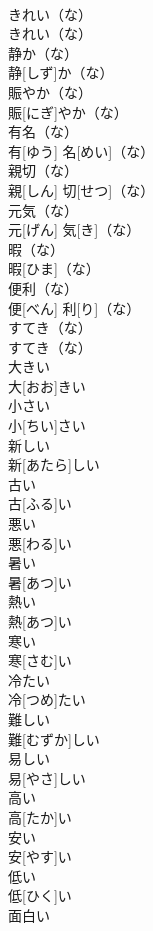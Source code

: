 \documentclass[8pt]{extreport}
\begin{document}
\begin{CJK}{UTF8}{min}
\\	きれい（な）	
\\	きれい（な）		
\\	静か（な）	
\\	静[しず]か（な）		
\\	賑やか（な）	
\\	賑[にぎ]やか（な）		
\\	有名（な）	
\\	有[ゆう] 名[めい]（な）		
\\	親切（な）	
\\	親[しん] 切[せつ]（な）		
\\	元気（な）	
\\	元[げん] 気[き]（な）		
\\	暇（な）	
\\	暇[ひま]（な）		
\\	便利（な）	
\\	便[べん] 利[り]（な）		
\\	すてき（な）	
\\	すてき（な）		
\\	大きい	
\\	大[おお]きい		
\\	小さい	
\\	小[ちい]さい		
\\	新しい	
\\	新[あたら]しい		
\\	古い	
\\	古[ふる]い		
\\	悪い	
\\	悪[わる]い		
\\	暑い	
\\	暑[あつ]い		
\\	熱い	
\\	熱[あつ]い		
\\	寒い	
\\	寒[さむ]い		
\\	冷たい	
\\	冷[つめ]たい		
\\	難しい	
\\	難[むずか]しい		
\\	易しい	
\\	易[やさ]しい		
\\	高い	
\\	高[たか]い		
\\	安い	
\\	安[やす]い		
\\	低い	
\\	低[ひく]い		
\\	面白い	

\end{CJK}
\end{document}
